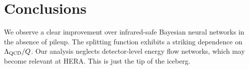\section{Conclusions}\label{sec:conclusions}

We observe a clear improvement over infrared-safe Bayesian neural
networks in the absence of pileup. The splitting function exhibits a
striking dependence on $\Lambda_{\rm QCD}/Q$. Our analysis neglects
detector-level energy flow networks, which may become relevant at HERA.
This is just the tip of the iceberg.

